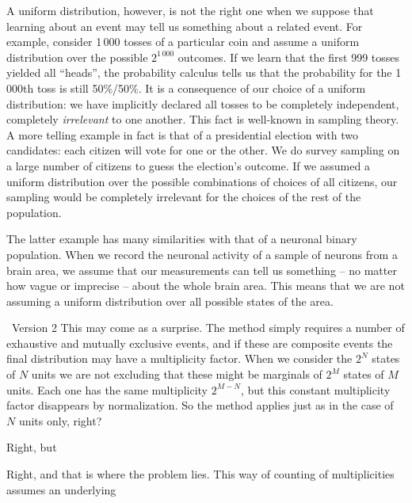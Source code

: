 \documentclass{article}
\theoremstyle{remark}
\theoremstyle{innote}
\renewcommand*{\|}{\mathpunct{|}}%
\theoremstyle{simple}
\newcommand*{\puzzle}{{\fontencoding{U}\fontfamily{fontawesometwo}\selectfont\symbol{225}}}
\newcommand*{\mynote}[1]{ {\color{notecolour}\puzzle\ #1}}
\begin{document}
A uniform distribution, however, is not the right one when we suppose that
learning about an event may tell us something about a related event. For
example, consider 1\,000 tosses of a particular coin and assume a uniform
distribution over the possible $2^{1\,000}$ outcomes. If we learn that the
first 999 tosses yielded all \enquote{heads}, the probability calculus
tells us that the probability for the 1\,000th toss is still 50\%/50\%. It
is a consequence of our choice of a uniform distribution: we have
implicitly declared all tosses to be completely independent, completely
\emph{irrelevant} to one another. This fact is well-known in sampling
theory. A more telling example in fact is that of a presidential election
with two candidates: each citizen will vote for one or the other. We do
survey sampling on a large number of citizens to guess the election's
outcome. If we assumed a uniform distribution over the possible
combinations of choices of all citizens, our sampling would be completely
irrelevant for the choices of the rest of the population.




The latter example has many similarities with that of a neuronal binary
population. When we record the neuronal activity of a sample of neurons from a
brain area, we assume that our measurements can tell us something -- no
matter how vague or imprecise -- about the whole brain area. This means
that we are not assuming a uniform distribution over all possible states of
the area.




\mynote{Version 2}
This may come as a surprise. The method simply requires a number of
exhaustive and mutually exclusive events, and if these are composite events
the final distribution may have a multiplicity factor. When we consider the
$2^{N}$ states of $N$ units we are not excluding that these might be
marginals of $2^{M}$ states of $M$ units. Each one has the same
multiplicity $2^{M-N}$, but this constant multiplicity factor disappears
by normalization. So the method applies just as in the case of $N$ units
only, right?

Right, but 

Right, and that is where the problem lies. This way of counting of
multiplicities assumes an underlying 
\end{document}

